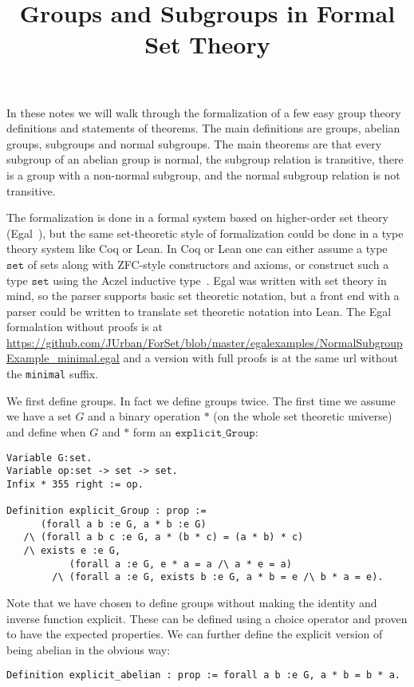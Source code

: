 \documentclass{article}
\title{Groups and Subgroups in Formal Set Theory}
\begin{document}
\maketitle

In these notes we will walk through the formalization of a few easy group theory definitions
and statements of theorems.
The main definitions are groups, abelian groups, subgroups and normal subgroups.
The main theorems are that every subgroup of an abelian group is normal,
the subgroup relation is transitive,
there is a group with a non-normal subgroup,
and the normal subgroup relation is not transitive.

The formalization is done in a formal system based on higher-order set theory (Egal~\cite{BrownPak2019}),
but the same set-theoretic style of formalization could be done in a type theory system like Coq or Lean.
In Coq or Lean one can either assume a type ${\mathtt{set}}$ of sets along with ZFC-style constructors
and axioms, or construct such a type ${\mathtt{set}}$ using the Aczel inductive type~\cite{Aczel98}.
Egal was written with set theory in mind, so the parser supports basic set theoretic notation,
but a front end with a parser could be written to translate set theoretic notation into Lean.
The Egal formalation without proofs is at\\
\url{https://github.com/JUrban/ForSet/blob/master/egalexamples/NormalSubgroupExample_minimal.egal}
and a version with full proofs is at the same url without the {\tt{minimal}} suffix.

We first define groups. In fact we define groups twice.
The first time we assume we have a set $G$ and a binary operation $*$ (on the whole set theoretic universe)
and define when $G$ and $*$ form an ${\mathtt{explicit\_Group}}$:
\begin{verbatim}
Variable G:set.
Variable op:set -> set -> set.
Infix * 355 right := op.

Definition explicit_Group : prop :=
      (forall a b :e G, a * b :e G)
   /\ (forall a b c :e G, a * (b * c) = (a * b) * c)
   /\ exists e :e G,
           (forall a :e G, e * a = a /\ a * e = a)
        /\ (forall a :e G, exists b :e G, a * b = e /\ b * a = e).
\end{verbatim}
Note that we have chosen to define groups without making the identity
and inverse function explicit. These can be defined using a choice operator
and proven to have the expected properties.
We can further define the explicit version of being abelian in the obvious way:
\begin{verbatim}
Definition explicit_abelian : prop := forall a b :e G, a * b = b * a.
\end{verbatim}
\end{document}
